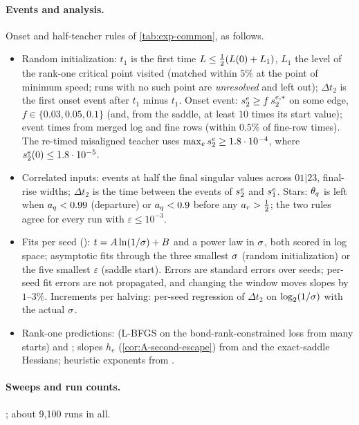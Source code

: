 \paragraph{Events and analysis.}
Onset and half-teacher rules of \cref{tab:exp-common}, as follows.
\begin{itemize}
  \item Random initialization: $t_1$ is the first time $L\le\frac12(L(0)+L_1)$, $L_1$ the level of the
    rank-one critical point visited (matched within $5\%$ at the point of minimum speed; runs with no such
    point are \emph{unresolved} and left out); $\Delta t_2$ is the first onset event after $t_1$ minus $t_1$.
    Onset event: $s^{e}_{2}\ge f\,s^{e,*}_{2}$ on some edge, $f\in\{0.03,0.05,0.1\}$ (and, from the saddle, at least 10
    times its start value); event times from merged log and fine rows (within $0.5\%$ of fine-row
    times). The re-timed misaligned teacher uses $\max_es^{e}_{2}\ge1.8\cdot10^{-4}$, where $s^{e}_{2}(0)\le1.8\cdot10^{-5}$.
  \item Correlated inputs: events at half the final singular values across $01|23$, final-rise widths;
    $\Delta t_2$ is the time between the events of $s^{e}_{2}$ and $s^{e}_{1}$. Stars: $\theta_q$ is left when $a_{q}<0.99$
    (departure) or $a_{q}<0.9$ before any $a_{r}>\frac12$; the two rules agree for every run with $\varepsilon\le10^{-3}$.
  \item Fits per seed (): $t=A\ln(1/\sigma)+B$ and a power law in $\sigma$, both scored in log space;
    asymptotic fits through the three smallest $\sigma$ (random initialization) or the five smallest $\varepsilon$
    (saddle start). Errors are standard errors over seeds; per-seed fit errors are not propagated, and
    changing the window moves slopes by $1$--$3\%$. Increments per halving: per-seed regression of
    $\Delta t_2$ on $\log_2(1/\sigma)$ with the actual $\sigma$.
  \item Rank-one predictions:  (L-BFGS on the bond-rank-constrained loss from many
    starts) and ; slopes $h_e$ (\cref{cor:A-second-escape}) from  and
    the exact-saddle Hessians; heuristic exponents from .
\end{itemize}

\paragraph{Sweeps and run counts.}
; about 9,100 runs in all.

